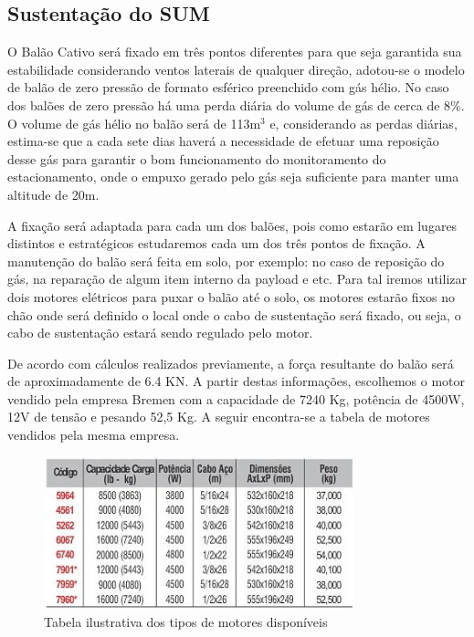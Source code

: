 \subsection{Sustentação do SUM}

O Balão Cativo será fixado em três pontos diferentes para que seja garantida sua estabilidade considerando ventos laterais de qualquer direção, adotou-se o modelo de balão de zero pressão de formato esférico preenchido com gás hélio. No caso dos balões de zero pressão há uma perda diária do volume de gás de cerca de 8\%. O volume de gás hélio no balão será de 113m$^{3}$ e, considerando as perdas diárias, estima-se que a cada sete dias haverá a necessidade de  efetuar uma reposição desse gás para garantir o bom funcionamento do monitoramento do estacionamento, onde o empuxo gerado pelo gás seja suficiente para manter uma altitude de 20m.

A fixação será adaptada para cada um dos balões, pois como estarão em lugares distintos e estratégicos estudaremos cada um dos três pontos de fixação. A manutenção do balão será feita em solo, por exemplo: no caso de reposição do gás, na reparação de algum item interno da payload e etc. Para tal iremos utilizar dois motores elétricos para puxar o balão até o solo, os motores estarão fixos no chão onde será definido o local onde o cabo de sustentação será fixado, ou seja, o cabo de sustentação estará sendo regulado pelo motor.

De acordo com cálculos realizados previamente, a força resultante do balão será de aproximadamente de 6.4 KN. A partir destas informações, escolhemos o motor vendido pela empresa Bremen com a capacidade de 7240 Kg, potência de 4500W, 12V de tensão e pesando 52,5 Kg. A seguir encontra-se a tabela de motores vendidos pela mesma empresa.

\begin{figure}[H]
	\centering
	\includegraphics[width=0.8\textwidth]{figuras/tabelamotor}
	\caption[Tabela ilustrativa dos tipos de motores disponíveis]{Tabela ilustrativa dos tipos de motores disponíveis~\cite{bremem}}
	\label{img:tabelamotor}
\end{figure}

